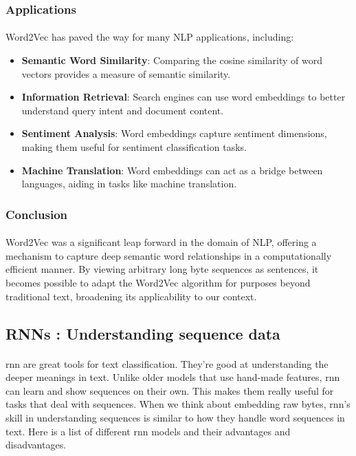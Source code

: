         \subsubsection{Applications}
        
            \paragraph{}Word2Vec has paved the way for many NLP applications, including:
            
            \begin{itemize}
                \item \textbf{Semantic Word Similarity}: Comparing the cosine similarity of word vectors provides a measure of semantic similarity.
                \item \textbf{Information Retrieval}: Search engines can use word embeddings to better understand query intent and document content.
                \item \textbf{Sentiment Analysis}: Word embeddings capture sentiment dimensions, making them useful for sentiment classification tasks.
                \item \textbf{Machine Translation}: Word embeddings can act as a bridge between languages, aiding in tasks like machine translation.
            \end{itemize}
            
        \subsubsection{Conclusion}

            \paragraph{}Word2Vec was a significant leap forward in the domain of NLP, offering a mechanism to capture deep semantic word relationships in a computationally efficient manner. By viewing arbitrary long byte sequences as sentences, it becomes possible to adapt the Word2Vec algorithm for purposes beyond traditional text, broadening its applicability to our context.
            
    

    \subsection{RNNs : Understanding sequence data}
        \paragraph{}\acrfull{rnn} are great tools for text classification. They're good at understanding the deeper meanings in text. Unlike older models that use hand-made features, \acrshort{rnn} can learn and show sequences on their own. This makes them really useful for tasks that deal with sequences. When we think about embedding raw bytes, \acrshort{rnn}'s skill in understanding sequences is similar to how they handle word sequences in text. Here is a list of different \acrshort{rnn} models and their advantages and disadvantages.

